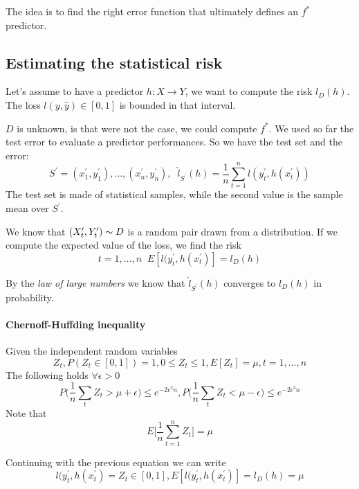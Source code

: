 

\begin{remark}
    The idea is to find the right error function that ultimately 
    defines an $f^*$ predictor.
\end{remark}

\subsection{Estimating the statistical risk}
Let's assume to have a predictor $h : X \rightarrow Y$, we want to compute the risk $l_D(h)$. 
The loss $l(y, \hat{y}) \in [0,1]$ is bounded in that interval.

$D$ is unknown, is that were not the case, we could compute $f^*$.
We used so far the test error to evaluate a predictor performances.
So we have the test set and the error:
$$S^\prime = (x^\prime_1, y^\prime_1), \dots, (x^\prime_n, y^\prime_n),\;\;
\hat{l}_{S^\prime}(h) = \frac{1}{n}\sum_{t = 1}^n l(y^\prime_t, h(x_t^\prime))$$
The test set is made of statistical samples, 
while the second value is the sample mean over $S^\prime$.

We know that $(X_t^\prime, Y_t^\prime) \thicksim D$ is a random pair drawn from a distribution.
If we compute the expected value of the loss, we find the risk
$$t = 1, \dots, n \;\; E[l(y^\prime_t, h(x_t^\prime)] = l_D(h)$$

By the \emph{law of large numbers} we know that $\hat{l}_{S^\prime}(h)$ converges to 
$l_D(h)$ in probability.

\paragraph{Chernoff-Huffding inequality}
Given the independent random variables $$Z_t,
P(Z_t \in [0,1]) = 1, 0 \leq Z_t \leq 1, E[Z_t] = \mu, t=1, \dots, n$$
The following holds $\forall \epsilon > 0$
$$P\bigg(\frac{1}{n}\sum_t Z_t > \mu + \epsilon\bigg) \leq e^{-2\epsilon ^2 n}, 
P\bigg(\frac{1}{n}\sum_t Z_t < \mu - \epsilon\bigg) \leq e^{-2\epsilon ^2 n}$$
Note that 
$$E\bigg[\frac{1}{n}\sum_{t=1}^{n}Z_t\bigg] = \mu$$

Continuing with the previous equation we can write
$$l(y^\prime_t, h(x_t^\prime) = Z_t \in [0,1], E[l(y^\prime_t, h(x_t^\prime)] = l_D(h) = \mu$$

